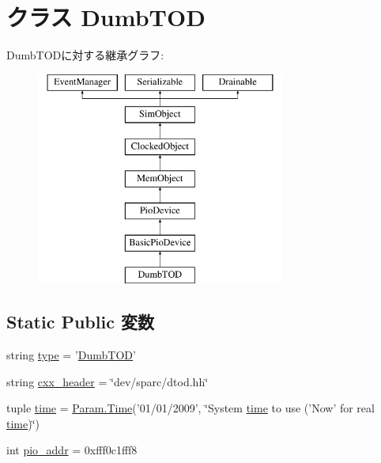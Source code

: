 \hypertarget{classT1000_1_1DumbTOD}{
\section{クラス DumbTOD}
\label{classT1000_1_1DumbTOD}
}
DumbTODに対する継承グラフ:\begin{figure}[H]
\begin{center}
\leavevmode
\includegraphics[height=7cm]{classT1000_1_1DumbTOD}
\end{center}
\end{figure}
\subsection*{Static Public 変数}
\begin{DoxyCompactItemize}
\item 
string \hyperlink{classT1000_1_1DumbTOD_acce15679d830831b0bbe8ebc2a60b2ca}{type} = '\hyperlink{classT1000_1_1DumbTOD}{DumbTOD}'
\item 
string \hyperlink{classT1000_1_1DumbTOD_a17da7064bc5c518791f0c891eff05fda}{cxx\_\-header} = \char`\"{}dev/sparc/dtod.hh\char`\"{}
\item 
tuple \hyperlink{classT1000_1_1DumbTOD_a429c35172fbcb8b1788bead147e4719b}{time} = \hyperlink{TypeDefines_8hh_ade1c8a9958f9e5394c2e78269e654872}{Param.Time}('01/01/2009', \char`\"{}System \hyperlink{classT1000_1_1DumbTOD_a429c35172fbcb8b1788bead147e4719b}{time} to use ('Now' for real \hyperlink{classT1000_1_1DumbTOD_a429c35172fbcb8b1788bead147e4719b}{time})\char`\"{})
\item 
int \hyperlink{classT1000_1_1DumbTOD_a659450bdbf05cdba8edf24c47df67671}{pio\_\-addr} = 0xfff0c1fff8
\end{DoxyCompactItemize}


